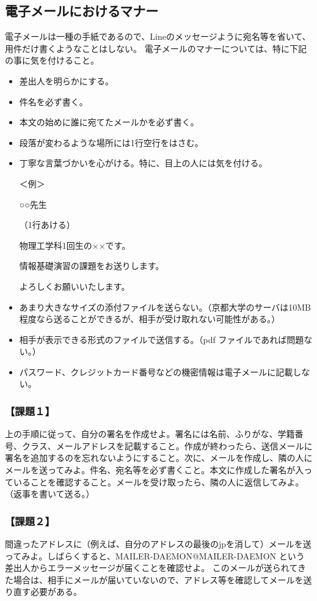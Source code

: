 \subsection{電子メールにおけるマナー}
電子メールは一種の手紙であるので、Lineのメッセージように宛名等を省いて、用件だけ書くようなことはしない。
電子メールのマナーについては、特に下記の事に気を付けること。
\begin{itemize}
\item 差出人を明らかにする。
\item 件名を必ず書く。
\item 本文の始めに誰に宛てたメールかを必ず書く。
\item 段落が変わるような場所には1行空行をはさむ。
\item 丁寧な言葉づかいを心がける。特に、目上の人には気を付ける。

＜例＞

○○先生

（1行あける）

物理工学科1回生の××です。

情報基礎演習の課題をお送りします。

よろしくお願いいたします。

\item あまり大きなサイズの添付ファイルを送らない。（京都大学のサーバは10MB程度なら送ることができるが、相手が受け取れない可能性がある。）
\item 相手が表示できる形式のファイルで送信する。（pdf ファイルであれば問題ない。）
\item パスワード、クレジットカード番号などの機密情報は電子メールに記載しない。

\end{itemize}

\subsubsection{【課題１】}
上の手順に従って、自分の署名を作成せよ。署名には名前、ふりがな、学籍番号、クラス、メールアドレスを記載すること。作成が終わったら、送信メールに署名を追加するのを忘れないようにすること。次に、メールを作成し、隣の人にメールを送ってみよ。件名、宛名等を必ず書くこと。本文に作成した署名が入っていることを確認すること。メールを受け取ったら、隣の人に返信してみよ。（返事を書いて送る。）

\subsubsection{【課題２】}
間違ったアドレスに（例えば、自分のアドレスの最後のjpを消して）メールを送ってみよ。しばらくすると、MAILER-DAEMON@MAILER-DAEMON という差出人からエラーメッセージが届くことを確認せよ。
このメールが送られてきた場合は、相手にメールが届いていないので、アドレス等を確認してメールを送り直す必要がある。


